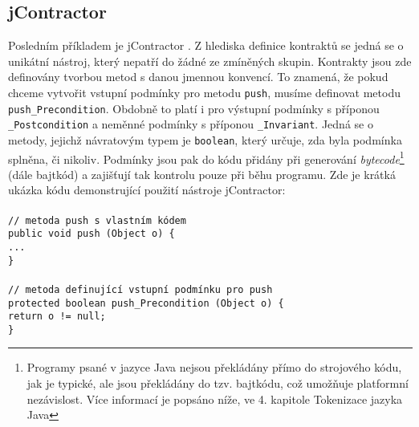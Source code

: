 		
		\subsection{jContractor}
			Posledním příkladem je jContractor \cite{jcontractor}. Z hlediska definice kontraktů se jedná se o unikátní nástroj, který nepatří do žádné ze zmíněných skupin. Kontrakty jsou zde definovány tvorbou metod s danou jmennou konvencí. To znamená, že pokud chceme vytvořit vstupní podmínky pro metodu \texttt{push}, musíme definovat metodu \texttt{push\_Precondition}. Obdobně to platí i pro výstupní podmínky s příponou \texttt{\_Postcondition} a neměnné podmínky s příponou \texttt{\_Invariant}. Jedná se o metody, jejichž návratovým typem je \texttt{boolean}, který určuje, zda byla podmínka splněna, či nikoliv. Podmínky jsou pak do kódu přidány při generování \emph{bytecode}\footnote{Programy psané v jazyce Java nejsou překládány přímo do strojového kódu, jak je typické, ale jsou překládány do tzv. bajtkódu, což umožňuje platformní nezávislost. Více informací je popsáno níže, ve 4. kapitole Tokenizace jazyka Java} (dále bajtkód) a zajišťují tak kontrolu pouze při běhu programu. Zde je krátká ukázka kódu demonstrující použití nástroje jContractor:\\\\  
				\- \- \- \- \- \texttt{\textcolor{pgrey}{// metoda push s vlastním kódem}}\\
				\- \- \- \- \- \texttt{public void push (Object o) \{}\\
				\- \- \- \- \- \- \- \- \- \- \texttt{...}\\
				\- \- \- \- \- \texttt{\}}\\\\
				\- \- \- \- \- \texttt{\textcolor{pgrey}{// metoda definující vstupní podmínku pro push}}\\
				\- \- \- \- \- \texttt{protected boolean push\_Precondition (Object o) \{}\\
				\- \- \- \- \- \- \- \- \- \- \texttt{return o != null;}\\
				\- \- \- \- \- \texttt{\}}\\
				

